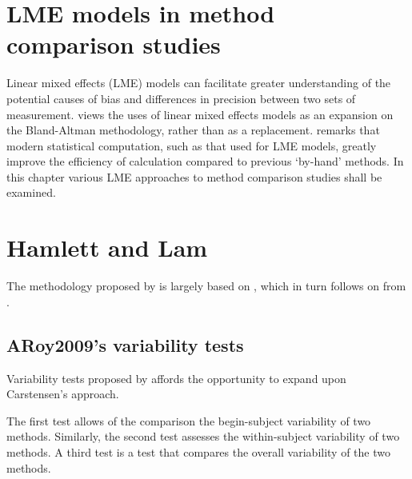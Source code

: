\documentclass[12pt, a4paper]{report}
\theoremstyle{plain}
\theoremstyle{definition}
\theoremstyle{remark}
\begin{document}
	\newpage
	
	
	
	\section{LME models in method comparison studies}
	
	Linear mixed effects (LME) models can facilitate greater understanding of the potential causes of bias and differences in
	precision between two sets of measurement. \citet{LaiShiao} views the uses of linear mixed effects models as an expansion on the
	Bland-Altman methodology, rather than as a replacement.
	\citet{BXC2008} remarks that modern statistical computation, such as that used for LME models, greatly improve the efficiency of
	calculation compared to previous `by-hand' methods. In this chapter various LME approaches to method comparison studies shall
	be examined.
	
	\newpage
	
	
	\section{Hamlett and Lam}
	The methodology proposed by \citet{AARoy20092009} is largely based on \citet{hamlett}, which in turn follows on from \citet{lam}.
	
	
	
	
	
	\subsection{ARoy2009's variability tests}
	Variability tests proposed by \citet{AARoy20092009} affords the opportunity to expand upon Carstensen's approach.
	
	The first test allows of the comparison the begin-subject variability of two methods. Similarly, the second test
	assesses the within-subject variability of two methods. A third test is a test that compares the overall variability of the two methods.
	
\end{document}
